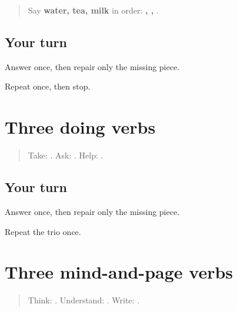 \label{lesson:MR-R14-food}



\begin{quote}
Say \textbf{water, tea, milk} in order: \textbf{, , }.
\end{quote}

\subsection*{Your turn}
Answer once, then repair only the missing piece.

\begin{tcolorbox}[breakable,colback=teal!4,colframe=teal!35!black,title={Before you move on}]
Repeat once, then stop.
\end{tcolorbox}
\section[\texorpdfstring{\mr{घेणे} / \mr{विचारणे} … (ghene / vicharne …)}{घेणे / विचारणे … (ghene / vicharne …)}]{Three doing verbs}

\label{lesson:MR-R14-doing}



\begin{quote}
Take: \textbf{}. Ask: \textbf{}. Help: \textbf{ }.
\end{quote}

\subsection*{Your turn}
Answer once, then repair only the missing piece.

\begin{tcolorbox}[breakable,colback=teal!4,colframe=teal!35!black,title={Before you move on}]
Repeat the trio once.
\end{tcolorbox}
\section[\texorpdfstring{\mr{विचार} \mr{करणे} / \mr{समजणे} … (vichar karne …)}{विचार करणे / समजणे … (vichar karne …)}]{Three mind-and-page verbs}

\label{lesson:MR-R14-mind}



\begin{quote}
Think: \textbf{ }. Understand: \textbf{}. Write: \textbf{}.
\end{quote}


